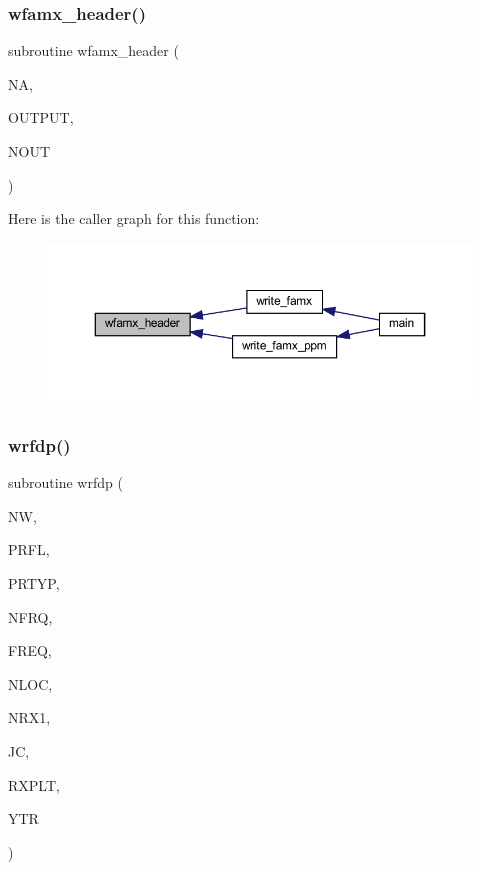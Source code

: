\subsubsection{\texorpdfstring{wfamx\+\_\+header()}{wfamx\_header()}}
{\footnotesize\ttfamily subroutine wfamx\+\_\+header (\begin{DoxyParamCaption}\item[{integer, intent(in)}]{NA,  }\item[{integer, intent(in)}]{O\+U\+T\+P\+UT,  }\item[{integer, intent(in)}]{N\+O\+UT }\end{DoxyParamCaption})}

Here is the caller graph for this function\+:
\nopagebreak
\begin{figure}[H]
\begin{center}
\leavevmode
\includegraphics[width=350pt]{Marco_8f90_a2bc01734a74feed58986986ff793df0b_icgraph}
\end{center}
\end{figure}
\mbox{\label{Marco_8f90_a325ce1448f0d02be280b64103f3b4793}} 
\subsubsection{\texorpdfstring{wrfdp()}{wrfdp()}}
{\footnotesize\ttfamily subroutine wrfdp (\begin{DoxyParamCaption}\item[{integer}]{NW,  }\item[{integer}]{P\+R\+FL,  }\item[{integer}]{P\+R\+T\+YP,  }\item[{integer}]{N\+F\+RQ,  }\item[{real, dimension(nfrq)}]{F\+R\+EQ,  }\item[{integer}]{N\+L\+OC,  }\item[{integer}]{N\+R\+X1,  }\item[{integer}]{JC,  }\item[{real(kind=8), dimension(3,nloc)}]{R\+X\+P\+LT,  }\item[{real, dimension(nfrq,nloc)}]{Y\+TR }\end{DoxyParamCaption})}

